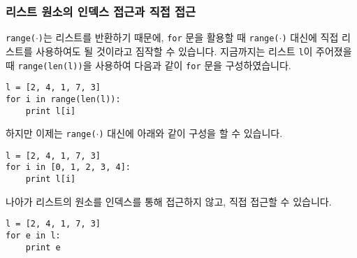\documentclass[../main.tex]{subfiles}
\begin{document}
\subsubsection{리스트 원소의 인덱스 접근과 직접 접근}
\texttt{range($\cdot$)}는 리스트를 반환하기 때문에, \texttt{for} 문을 활용할 때 \texttt{range($\cdot$)} 대신에 직접 리스트를 사용하여도 될 것이라고 짐작할 수 있습니다.
지금까지는 리스트 \texttt{l}이 주어졌을 때 \texttt{range(len(l))}을 사용하여 다음과 같이 \texttt{for} 문을 구성하였습니다.
\begin{verbatim}
l = [2, 4, 1, 7, 3]
for i in range(len(l)):
    print l[i]
\end{verbatim}
하지만 이제는 \texttt{range($\cdot$)} 대신에 아래와 같이 구성을 할 수 있습니다.
\begin{verbatim}
l = [2, 4, 1, 7, 3]
for i in [0, 1, 2, 3, 4]:
    print l[i]
\end{verbatim}
나아가 리스트의 원소를 인덱스를 통해 접근하지 않고, 직접 접근할 수 있습니다.
\begin{verbatim}
l = [2, 4, 1, 7, 3]
for e in l:
    print e
\end{verbatim}
\end{document}
